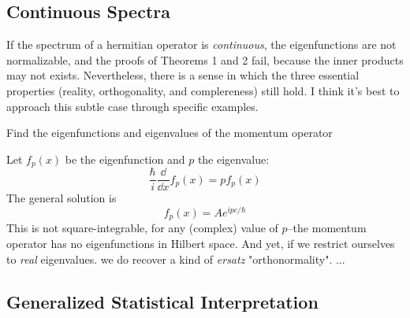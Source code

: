 \subsection{Continuous Spectra}
If the spectrum of a hermitian operator is \textit{continuous}, the eigenfunctions are not normalizable, and the proofs of Theorems 1 and 2 fail, because the inner products may not exists. Nevertheless, there is a sense in which the three essential properties (reality, orthogonality, and complereness) still hold. I think it's best to approach this subtle case through specific examples.

\begin{example}
	Find the eigenfunctions and eigenvalues of the momentum operator
\end{example}
\begin{sol}
\end{sol}
Let $f_p(x)$ be the eigenfunction and $p$ the eigenvalue:
\begin{equation}\label{3.30}
	\frac{\hbar}{i}\frac{\dd}{\dd x}f_p(x)=pf_p(x)
\end{equation}
The general solution is $$f_p(x)=Ae^{ipc/\hbar}$$ This is not square-integrable, for any (complex) value of $p$--the momentum operator has no eigenfunctions in Hilbert space. And yet, if we restrict ourselves to \textit{real} eigenvalues. we do recover a kind of \textit{ersatz} "orthonormality". ...

\subsection{Generalized Statistical Interpretation}














